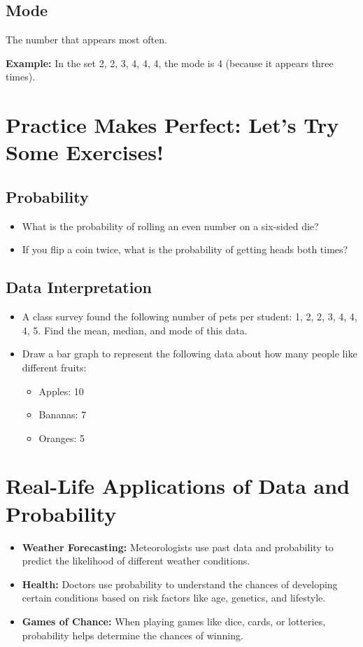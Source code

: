 \subsection{Mode}
The number that appears most often.

\textbf{Example:} In the set 2, 2, 3, 4, 4, 4, the mode is 4 (because it appears three times).

\section{Practice Makes Perfect: Let’s Try Some Exercises!}
\subsection{Probability}
\begin{itemize}
    \item What is the probability of rolling an even number on a six-sided die?
    \item If you flip a coin twice, what is the probability of getting heads both times?
\end{itemize}

\subsection{Data Interpretation}
\begin{itemize}
    \item A class survey found the following number of pets per student: 1, 2, 2, 3, 4, 4, 4, 5. Find the mean, median, and mode of this data.
    \item Draw a bar graph to represent the following data about how many people like different fruits:
    \begin{itemize}
        \item Apples: 10
        \item Bananas: 7
        \item Oranges: 5
    \end{itemize}
\end{itemize}

\section{Real-Life Applications of Data and Probability}
\begin{itemize}
    \item \textbf{Weather Forecasting:} Meteorologists use past data and probability to predict the likelihood of different weather conditions.
    \item \textbf{Health:} Doctors use probability to understand the chances of developing certain conditions based on risk factors like age, genetics, and lifestyle.
    \item \textbf{Games of Chance:} When playing games like dice, cards, or lotteries, probability helps determine the chances of winning.
\end{itemize}

